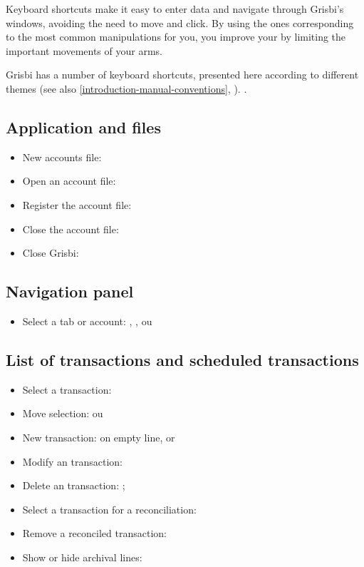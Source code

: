 Keyboard shortcuts make it easy to enter data and navigate through Grisbi's windows, avoiding the need to move and click. By using the ones corresponding to the most common manipulations for you, you improve your  by limiting the important movements of your arms.
 
Grisbi has a number of keyboard shortcuts, presented here according to different themes (see also  \vref{introduction-manual-conventions}, ).
.

\subsection{Application and files}

\begin{itemize}
	\item New accounts file: 
	\item Open an account file: 
	\item Register the account file: 
	\item Close the account file: 
	\item Close Grisbi: 
\end{itemize}


\subsection{Navigation panel}

\begin{itemize}
	\item Select a tab or account: , ,  ou 
\end{itemize}

\subsection{List of transactions and scheduled transactions}

\begin{itemize}
	\item Select a transaction: 
	\item Move selection: ou 
	\item New transaction:   on empty line, or 
	\item Modify an transaction: 
	\item Delete an transaction: ;
	\item Select a transaction for a reconciliation:
	\item Remove a reconciled transaction: 
	\item Show or hide archival lines: 
\end{itemize}


